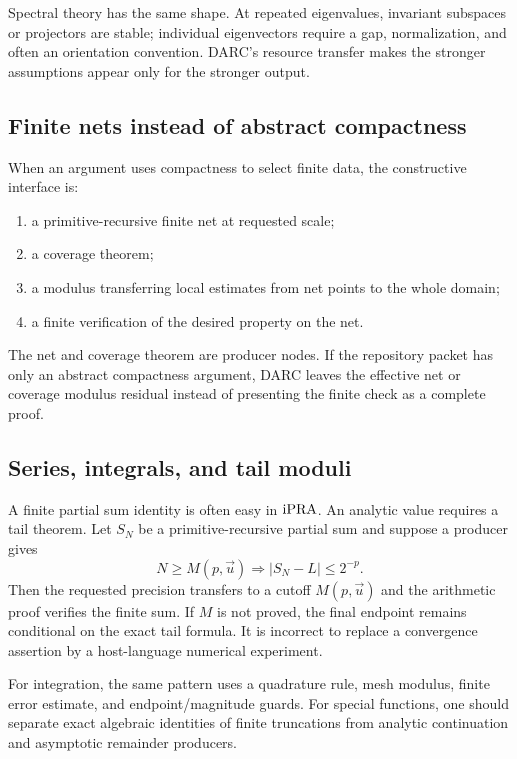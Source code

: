 Spectral theory has the same shape.  At repeated eigenvalues, invariant
subspaces or projectors are stable; individual eigenvectors require a gap,
normalization, and often an orientation convention.  DARC's resource transfer
makes the stronger assumptions appear only for the stronger output.

\subsection{Finite nets instead of abstract compactness}

When an argument uses compactness to select finite data, the constructive
interface is:
\begin{enumerate}
  \item a primitive-recursive finite net at requested scale;
  \item a coverage theorem;
  \item a modulus transferring local estimates from net points to the whole
        domain;
  \item a finite verification of the desired property on the net.
\end{enumerate}
The net and coverage theorem are producer nodes.  If the repository packet has
only an abstract compactness argument, DARC leaves the effective net or
coverage modulus residual instead of presenting the finite check as a complete
proof.

\subsection{Series, integrals, and tail moduli}

A finite partial sum identity is often easy in \(\mathrm{iPRA}\).  An analytic value
requires a tail theorem.  Let \(S_N\) be a primitive-recursive partial sum and
suppose a producer gives
\[
  N\ge M(p,\vec u)
  \Longrightarrow
  |S_N-L|\le 2^{-p}.
\]
Then the requested precision transfers to a cutoff \(M(p,\vec u)\) and the
arithmetic proof verifies the finite sum.  If \(M\) is not proved, the final
endpoint remains conditional on the exact tail formula.  It is incorrect to
replace a convergence assertion by a host-language numerical experiment.

For integration, the same pattern uses a quadrature rule, mesh modulus,
finite error estimate, and endpoint/magnitude guards.  For special functions,
one should separate exact algebraic identities of finite truncations from
analytic continuation and asymptotic remainder producers.

